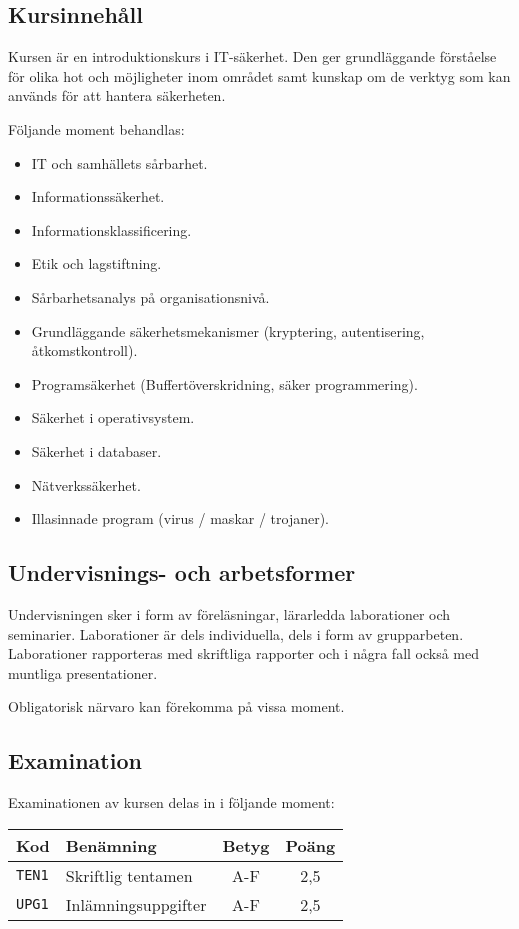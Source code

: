 \subsection*{Kursinnehåll}

Kursen är en introduktionskurs i IT-säkerhet. Den ger grundläggande
förståelse för olika hot och möjligheter inom området samt kunskap om de
verktyg som kan används för att hantera säkerheten.

Följande moment behandlas:

\begin{itemize}
\tightlist
\item
  IT och samhällets sårbarhet.
\item
  Informationssäkerhet.
\item
  Informationsklassificering.
\item
  Etik och lagstiftning.
\item
  Sårbarhetsanalys på organisationsnivå.
\item
  Grundläggande säkerhetsmekanismer (kryptering, autentisering,
  åtkomstkontroll).
\item
  Programsäkerhet (Buffertöverskridning, säker programmering).
\item
  Säkerhet i operativsystem.
\item
  Säkerhet i databaser.
\item
  Nätverkssäkerhet.
\item
  Illasinnade program (virus / maskar / trojaner).
\end{itemize}

\subsection*{Undervisnings- och
arbetsformer}

Undervisningen sker i form av föreläsningar, lärarledda laborationer och
seminarier. Laborationer är dels individuella, dels i form av
grupparbeten. Laborationer rapporteras med skriftliga rapporter och i
några fall också med muntliga presentationer.

Obligatorisk närvaro kan förekomma på vissa moment.

\subsection*{Examination}

Examinationen av kursen delas in i följande moment:

\begin{longtable}[]{@{}llcc@{}}
\toprule
\textsf{Kod} & \textsf{Benämning} & \textsf{Betyg} & \textsf{Poäng}\tabularnewline
\midrule
\endhead
\texttt{TEN1} & Skriftlig tentamen & A-F & 2,5\tabularnewline
\texttt{UPG1} & Inlämningsuppgifter & A-F & 2,5\tabularnewline
\bottomrule
\end{longtable}

